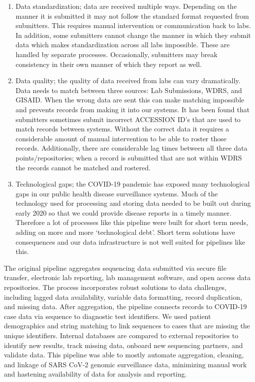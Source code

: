 \documentclass[
  letterpaper,
  DIV=11,
  numbers=noendperiod]{scrartcl}
\providecommand{\tightlist}{%
  \setlength{\itemsep}{0pt}\setlength{\parskip}{0pt}}\usepackage{longtable,booktabs,array}
\begin{document}
\begin{enumerate}
\def\labelenumi{\arabic{enumi}.}
\tightlist
\item
  Data standardization; data are received multiple ways. Depending on
  the manner it is submitted it may not follow the standard format
  requested from submitters. This requires manual intervention or
  communication back to labs. In addition, some submitters cannot change
  the manner in which they submit data which makes standardization
  across all labs impossible. These are handled by separate processes.
  Occasionally, submitters may break consistency in their own manner of
  which they report as well.
\item
  Data quality; the quality of data received from labs can vary
  dramatically. Data needs to match between three sources: Lab
  Submissions, WDRS, and GISAID. When the wrong data are sent this can
  make matching impossible and prevents records from making it into our
  systems. It has been found that submitters sometimes submit incorrect
  ACCESSION ID's that are used to match records between systems. Without
  the correct data it requires a considerable amount of manual
  intervention to be able to roster those records. Additionally, there
  are considerable lag times between all three data points/repositories;
  when a record is submitted that are not within WDRS the records cannot
  be matched and rostered.
\item
  Technological gaps; the COVID-19 pandemic has exposed many
  technological gaps in our public health disease surveillance systems.
  Much of the technology used for processing and storing data needed to
  be built out during early 2020 so that we could provide disease
  reports in a timely manner. Therefore a lot of processes like this
  pipeline were built for short term needs, adding on more and more
  `technological debt'. Short term solutions have consequences and our
  data infrastructure is not well suited for pipelines like this.
\end{enumerate}

The original pipeline aggregates sequencing data submitted via secure
file transfer, electronic lab reporting, lab management software, and
open access data repositories. The process incorporates robust solutions
to data challenges, including lagged data availability, variable data
formatting, record duplication, and missing data. After aggregation, the
pipeline connects records to COVID-19 case data via sequence to
diagnostic test identifiers. We used patient demographics and string
matching to link sequences to cases that are missing the unique
identifiers. Internal databases are compared to external repositories to
identify new results, track missing data, onboard new sequencing
partners, and validate data. This pipeline was able to mostly automate
aggregation, cleaning, and linkage of SARS CoV-2 genomic surveillance
data, minimizing manual work and hastening availability of data for
analysis and reporting.
\end{document}
